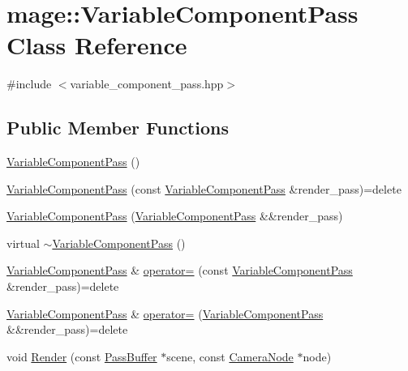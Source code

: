 \hypertarget{classmage_1_1_variable_component_pass}{}\section{mage\+:\+:Variable\+Component\+Pass Class Reference}
\label{classmage_1_1_variable_component_pass}


{\ttfamily \#include $<$variable\+\_\+component\+\_\+pass.\+hpp$>$}

\subsection*{Public Member Functions}
\begin{DoxyCompactItemize}
\item 
\hyperlink{classmage_1_1_variable_component_pass_a86224a1702761665451b3c6e78557261}{Variable\+Component\+Pass} ()
\item 
\hyperlink{classmage_1_1_variable_component_pass_a535ac4989db673e69870090494f454dd}{Variable\+Component\+Pass} (const \hyperlink{classmage_1_1_variable_component_pass}{Variable\+Component\+Pass} \&render\+\_\+pass)=delete
\item 
\hyperlink{classmage_1_1_variable_component_pass_a2721ef623ca91abfac8ae7092094a0fb}{Variable\+Component\+Pass} (\hyperlink{classmage_1_1_variable_component_pass}{Variable\+Component\+Pass} \&\&render\+\_\+pass)
\item 
virtual \hyperlink{classmage_1_1_variable_component_pass_addf03c307a88e6a1871f0ec3adbb8bcb}{$\sim$\+Variable\+Component\+Pass} ()
\item 
\hyperlink{classmage_1_1_variable_component_pass}{Variable\+Component\+Pass} \& \hyperlink{classmage_1_1_variable_component_pass_a9df39d8323fea2b411a4f84abe8bac3c}{operator=} (const \hyperlink{classmage_1_1_variable_component_pass}{Variable\+Component\+Pass} \&render\+\_\+pass)=delete
\item 
\hyperlink{classmage_1_1_variable_component_pass}{Variable\+Component\+Pass} \& \hyperlink{classmage_1_1_variable_component_pass_ab4c2ccc632031ec51c16f7c9d500e427}{operator=} (\hyperlink{classmage_1_1_variable_component_pass}{Variable\+Component\+Pass} \&\&render\+\_\+pass)=delete
\item 
void \hyperlink{classmage_1_1_variable_component_pass_a012b74d72c3755b732d21f857f85a246}{Render} (const \hyperlink{structmage_1_1_pass_buffer}{Pass\+Buffer} $\ast$scene, const \hyperlink{classmage_1_1_camera_node}{Camera\+Node} $\ast$node)
\end{DoxyCompactItemize}
